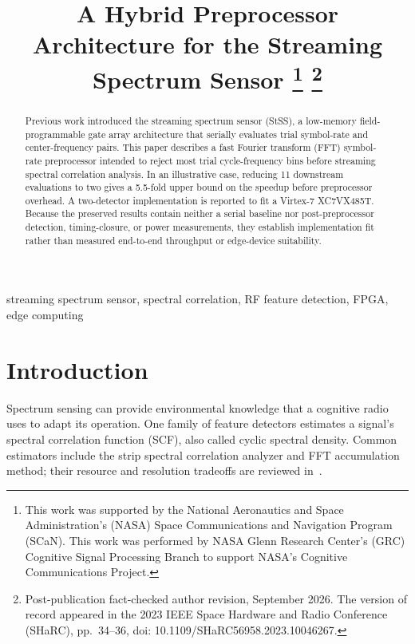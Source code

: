 \documentclass[conference]{IEEEtran}
\begin{document}
\title{\textbf{A Hybrid Preprocessor Architecture for the Streaming Spectrum Sensor}
\thanks{This work was supported by the National Aeronautics and Space Administration's (NASA) Space Communications and Navigation Program (SCaN). This work was performed by NASA Glenn Research Center's (GRC) Cognitive Signal Processing Branch to support NASA's Cognitive Communications Project.}
\thanks{Post-publication fact-checked author revision, September 2026. The version of record appeared in the 2023 IEEE Space Hardware and Radio Conference (SHaRC), pp.~34--36, doi: 10.1109/SHaRC56958.2023.10046267.}}

\author{
}


\maketitle

\begin{abstract}
Previous work introduced the streaming spectrum sensor (StSS), a low-memory field-programmable gate array architecture that serially evaluates trial symbol-rate and center-frequency pairs. This paper describes a fast Fourier transform (FFT) symbol-rate preprocessor intended to reject most trial cycle-frequency bins before streaming spectral correlation analysis. In an illustrative case, reducing 11 downstream evaluations to two gives a 5.5-fold upper bound on the speedup before preprocessor overhead. A two-detector implementation is reported to fit a Virtex-7 XC7VX485T. Because the preserved results contain neither a serial baseline nor post-preprocessor detection, timing-closure, or power measurements, they establish implementation fit rather than measured end-to-end throughput or edge-device suitability.
\end{abstract}

\begin{IEEEkeywords}
streaming spectrum sensor, spectral correlation, RF feature detection, FPGA, edge computing
\end{IEEEkeywords}

\section{Introduction}
Spectrum sensing can provide environmental knowledge that a cognitive radio uses to adapt its operation. One family of feature detectors estimates a signal's spectral correlation function (SCF), also called cyclic spectral density. Common estimators include the strip spectral correlation analyzer and FFT accumulation method; their resource and resolution tradeoffs are reviewed in~\cite{gormley-msee21}.
\end{document}
